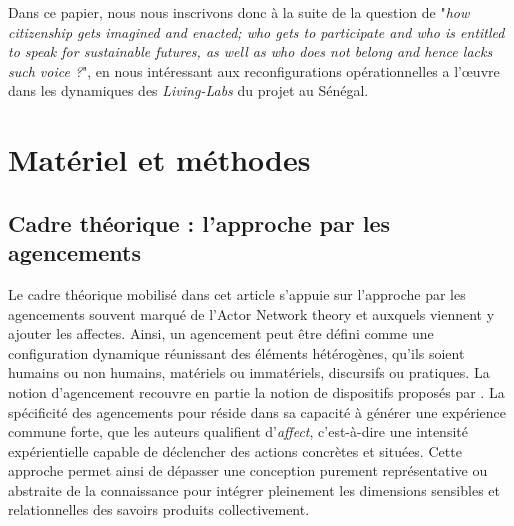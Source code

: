 \documentclass{article}
\begin{document}
Dans ce papier, nous nous inscrivons donc à la suite de la question de \textcite[p.148]{beck_governance_2021} "\textit{how citizenship gets imagined and enacted; who gets to participate and who is entitled to speak for sustainable futures, as well as who does not belong and hence lacks such voice ?}", en nous intéressant aux reconfigurations opérationnelles a l'\oe{}uvre dans les dynamiques des \textit{Living-Labs} du projet au Sénégal.




\section{Matériel et méthodes}
\subsection{Cadre théorique : l'approche par les agencements}

Le cadre théorique mobilisé dans cet article s'appuie sur l'approche par les agencements souvent marqué de l'Actor Network theory \parencite{callon_techno-economic_1990, goulet_characterizing_2021} et auxquels \textcite{hertz_knowledge_2025} viennent y ajouter les affectes. Ainsi, un agencement peut être défini comme une configuration dynamique réunissant des éléments hétérogènes, qu'ils soient humains ou non humains, matériels ou immatériels, discursifs ou pratiques. La notion d'agencement recouvre en partie la notion de dispositifs proposés par \textcite{foucault_jeu_1977}. La spécificité des agencements pour \textcite{hertz_knowledge_2025} réside dans sa capacité à générer une expérience commune forte, que les auteurs qualifient d'\textit{affect}, c'est-à-dire une intensité expérientielle capable de déclencher des actions concrètes et situées. Cette approche permet ainsi de dépasser une conception purement représentative ou abstraite de la connaissance pour intégrer pleinement les dimensions sensibles et relationnelles des savoirs produits collectivement.
\end{document}
